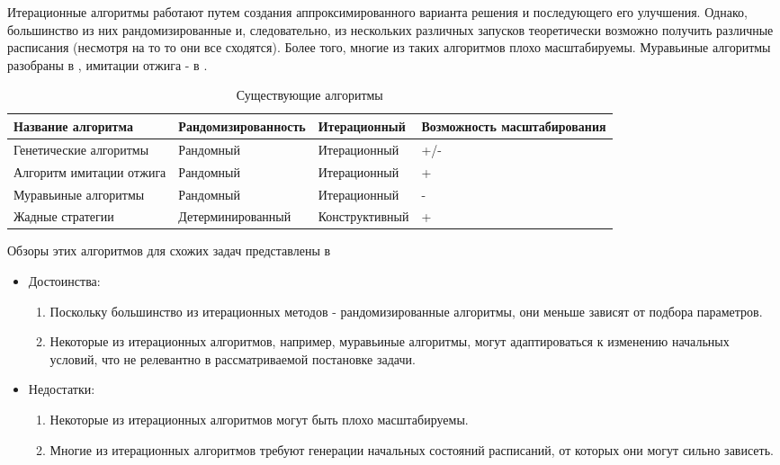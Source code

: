 Итерационные алгоритмы работают путем создания аппроксимированного варианта решения и последующего его улучшения. Однако, большинство из них рандомизированные и, следовательно, из нескольких различных запусков теоретически возможно получить различные расписания (несмотря на то то они все сходятся). Более того, многие из таких алгоритмов плохо масштабируемы. Муравьиные алгоритмы разобраны в \cite{Shtovba_2005}, имитации отжига - в \cite{Kirkpatrick_1983}.
\begin{table}[H]
    \begin{tabularx}{\textwidth}{ X | l | X | X  }
        Название алгоритма       & Рандомизированность & Итерационный   & Возможность  масштабирования \\
        \hline
        Генетические алгоритмы   & Рандомный           & Итерационный   & +/-                          \\
        Алгоритм имитации отжига & Рандомный           & Итерационный   & +                            \\
        Муравьиные алгоритмы     & Рандомный           & Итерационный   & -                            \\
        Жадные стратегии         & Детерминированный   & Конструктивный & +                            \\
    \end{tabularx}
    \caption{Существующие алгоритмы}
    \label{tbl:review}
\end{table}

Обзоры этих алгоритмов для схожих задач представлены в \cite{Coffman,Davis_2011,Shakhbazyan_1981}

\begin{itemize}
    \item Достоинства:
          \begin{enumerate}
              \item Поскольку большинство из итерационных методов - рандомизированные алгоритмы, они меньше зависят от подбора параметров.
              \item Некоторые из итерационных алгоритмов, например, муравьиные алгоритмы, могут адаптироваться к изменению начальных условий, что не релевантно в рассматриваемой постановке задачи.
          \end{enumerate}
    \item Недостатки:
          \begin{enumerate}
              \item Некоторые из итерационных алгоритмов могут быть плохо масштабируемы.
              \item Многие из итерационных алгоритмов требуют генерации начальных состояний расписаний, от которых они могут сильно зависеть.
          \end{enumerate}
\end{itemize}